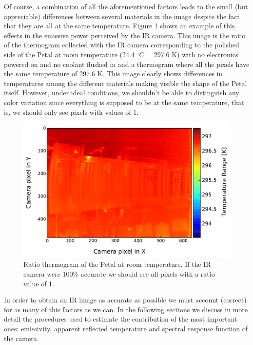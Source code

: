 		Of course, a combination of all the aforementioned factors leads to the small (but appreciable) differences between several materials in the image despite the fact that they are all at the same temperature. Figure \ref{fig3.4} shows an example of this effects in the emissive power perceived by the IR camera. This image is the ratio of the thermogram collected with the IR camera corresponding to the polished side of the Petal at room temperature (24.4 $^\circ C$ = 297.6 K) with no electronics powered on and no coolant flushed in and a thermogram where all the pixels have the same temperature of 297.6 K. This image clearly shows differences in temperatures among the different materials making visible the shape of the Petal itself. However, under ideal conditions, we shouldn't be able to distinguish any color variation since everything is supposed to be at the same temperature, that is, we should only see pixels with values of 1.
		
		\begin{figure}[ht!]
			\centering
			\captionsetup{justification=centering,margin=2cm}
			\includegraphics[scale=0.5]{Figures/Chapter03/thermo_Temp_201708091701_avg.pdf}
			\caption{Ratio thermogram of the Petal at room temperature. If the IR camera were 100\% accurate we should see all pixels with a ratio value of 1.}\label{fig3.4}
		\end{figure}
		
		In order to obtain an IR image as accurate as possible we must account (correct) for as many of this factors as we can. In the following sections we discuss in more detail the procedures used to estimate the contribution of the most important ones: emissivity, apparent reflected temperature and spectral response function of the camera.
	
